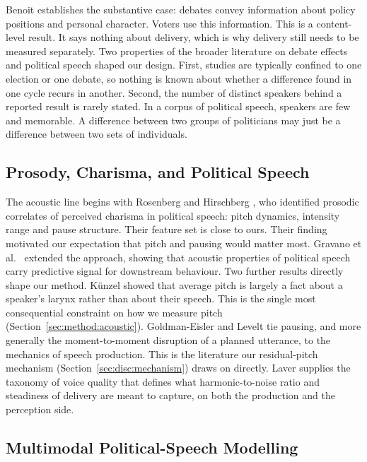 \documentclass[pdflatex,sn-mathphys-num]{sn-jnl}%
\begin{document}
Benoit \cite{benoit2014debates} establishes the substantive case: debates
convey information about policy positions and personal character. Voters
use this information. This is a content-level result. It says nothing about
delivery, which is why delivery still needs to be measured separately. Two
properties of the broader literature on debate effects and political speech
shaped our design. First, studies are typically confined to one election or
one debate, so nothing is known about whether a difference found in one
cycle recurs in another. Second, the number of distinct speakers behind a
reported result is rarely stated. In a corpus of political speech, speakers
are few and memorable. A difference between two groups of politicians
may just be a difference between two sets of individuals.

\subsection{Prosody, Charisma, and Political Speech}
\label{sec:related:prosody}

The acoustic line begins with Rosenberg and Hirschberg
\cite{rosenberg2009acoustic}, who identified prosodic correlates of
perceived charisma in political speech: pitch dynamics, intensity range and
pause structure. Their feature set is close to ours. Their finding
motivated our expectation that pitch and pausing would matter most. Gravano
et al.\ \cite{hutto2018political} extended the approach, showing that
acoustic properties of political speech carry predictive signal for
downstream behaviour. Two further results directly shape our method.
K\"unzel \cite{kunzel1989speakers} showed that average pitch is largely a
fact about a speaker's larynx rather than about their speech. This is the
single most consequential constraint on how we measure pitch
(Section~\ref{sec:method:acoustic}). Goldman-Eisler
\cite{goldman1968psycholinguistics} and Levelt \cite{levelt1989speaking} tie
pausing, and more generally the moment-to-moment disruption of a planned
utterance, to the mechanics of speech production. This is the literature
our residual-pitch mechanism (Section~\ref{sec:disc:mechanism}) draws on
directly. Laver \cite{laver1980voice} supplies the taxonomy of voice
quality that defines what harmonic-to-noise ratio and steadiness of
delivery are meant to capture, on both the production and the perception
side.

\subsection{Multimodal Political-Speech Modelling}
\label{sec:related:multimodal}
\end{document}
